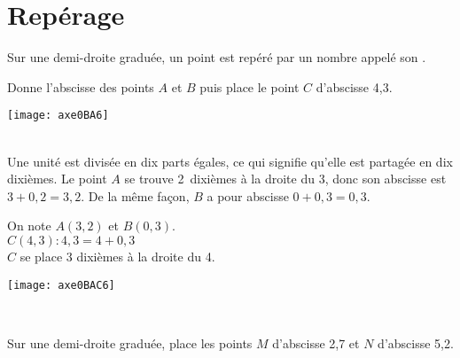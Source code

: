 
\section{Repérage}

\begin{aconnaitre}
Sur une demi-droite graduée, un point est repéré par un nombre appelé son \textbf{}.
\end{aconnaitre}

\begin{methode*1}



\begin{exemple*1}

\vspace{0.5cm}

 \begin{minipage}[c]{.46\textwidth}
 Donne l'abscisse des points $A$ et $B$ puis place le point $C$ d'abscisse 4,3.
  \end{minipage}\hfill%
 \begin{minipage}[c]{.46\textwidth} 
\texttt{[image: axe0BA6]}
 \end{minipage}\\

Une unité est divisée en dix parts égales, ce qui signifie qu'elle est partagée en dix dixièmes. Le point $A$ se trouve 2 dixièmes à la droite du 3, donc son abscisse est $3 + 0,2 = 3,2$. De la même façon, $B$ a pour abscisse $0 + 0,3 = 0,3$. \\

  \begin{minipage}[c]{.46\textwidth}
On note $A(3,2)$ et $B(0,3)$.\\
$C(4,3) : 4,3 = 4 + 0,3$\\
$C$ se place 3 dixièmes à la droite du 4.
  \end{minipage}\hfill%
 \begin{minipage}[c]{.46\textwidth} 
\texttt{[image: axe0BAC6]}
 \end{minipage}\\

\end{exemple*1}

\exercice 

Sur une demi-droite graduée, place les points $M$ d'abscisse 2,7 et $N$ d'abscisse 5,2.

\end{methode*1}

